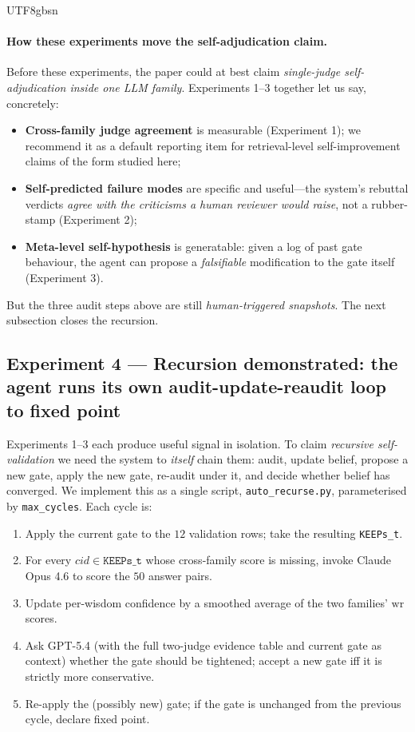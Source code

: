 \documentclass{article}
\begin{document}
\begin{CJK*}{UTF8}{gbsn}
\paragraph{How these experiments move the self-adjudication claim.}
Before these experiments, the paper could at best claim
\emph{single-judge self-adjudication inside one LLM family}.
Experiments 1--3 together let us say, concretely:
\begin{itemize}[leftmargin=*, topsep=2pt, itemsep=1pt]
  \item \textbf{Cross-family judge agreement} is measurable
    (Experiment 1); we recommend it as a default reporting item
    for retrieval-level self-improvement claims of the form
    studied here;
  \item \textbf{Self-predicted failure modes} are specific and
    useful—the system's rebuttal verdicts \emph{agree with the
    criticisms a human reviewer would raise}, not a rubber-stamp
    (Experiment 2);
  \item \textbf{Meta-level self-hypothesis} is generatable: given a
    log of past gate behaviour, the agent can propose a
    \emph{falsifiable} modification to the gate itself (Experiment 3).
\end{itemize}
But the three audit steps above are still \emph{human-triggered
snapshots}. The next subsection closes the recursion.

\subsection{Experiment 4 — Recursion demonstrated: the agent runs
its own audit-update-reaudit loop to fixed point}
\label{sec:recursion}

Experiments 1--3 each produce useful signal in isolation. To claim
\emph{recursive self-validation} we need the system to
\emph{itself} chain them: audit, update belief, propose a new
gate, apply the new gate, re-audit under it, and decide whether
belief has converged. We implement this as a single script,
\texttt{auto\_recurse.py}, parameterised by
\texttt{max\_cycles}. Each cycle is:

\begin{enumerate}[leftmargin=*, topsep=2pt, itemsep=1pt]
  \item Apply the current gate to the \(12\) validation rows; take
    the resulting \texttt{KEEPs\_t}.
  \item For every \(cid \in \texttt{KEEPs\_t}\) whose cross-family
    score is missing, invoke Claude Opus 4.6 to score the \(50\)
    answer pairs.
  \item Update per-wisdom confidence by a smoothed average of the
    two families' \(\text{wr}\) scores.
  \item Ask GPT-5.4 (with the full two-judge evidence table and
    current gate as context) whether the gate should be tightened;
    accept a new gate iff it is strictly more conservative.
  \item Re-apply the (possibly new) gate; if the gate is unchanged
    from the previous cycle, declare fixed point.
\end{enumerate}


\end{CJK*}
\end{document}
